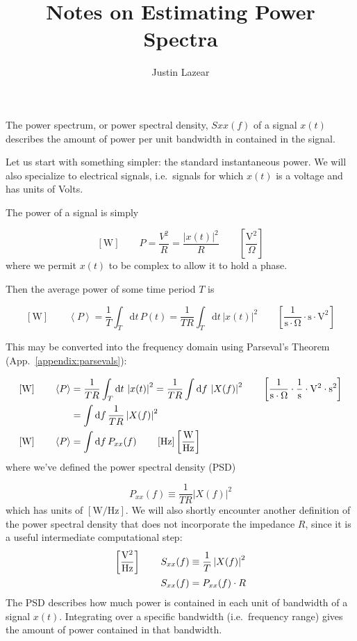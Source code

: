 \documentclass{article}
\title{Notes on Estimating Power Spectra}
\author{Justin Lazear}
\newcommand{\dd}[1]{\mathrm{d}#1\,}
\newcommand{\Avg}[1]{\left< #1 \right>}
\begin{document}
\maketitle

The power spectrum, or power spectral density, \(Sxx(f)\) of a signal \(x(t)\) 
describes the amount of power per unit bandwidth in contained in the signal. 

Let us start with something simpler: the standard instantaneous power. We will
also specialize to electrical signals, i.e.~signals for which \(x(t)\) is a 
voltage and has units of Volts. 

The power of a signal is simply

\[\left[\mathrm{W}\right] \qquad P = \frac{V^2}{R} = \frac{\left|x(t)\right|^2}{R} \qquad \left[\frac{\mathrm{V}^2}{\Omega}\right]\]
%
where we permit \(x(t)\) to be complex to allow it to hold a phase. 

Then the average power of some time period \(T\) is

\begin{equation}
    \left[\mathrm{W}\right] \qquad \Avg{P} = \frac{1}{T} \int_T \dd{t} P(t) = \frac{1}{TR} \int_T \dd{t} \left|x(t)\right|^2 \qquad \left[\mathrm{\frac{1}{s\cdot \Omega} \cdot s \cdot V^2}\right] \label{eq:power}
\end{equation}

This may be converted into the frequency domain using Parseval's Theorem
(App.~\ref{appendix:parsevals}):

\begin{align}
    \left[\mathrm{W}\right] \qquad \Avg{P} & = \frac{1}{TR} \int_T \dd{t} \left|x(t)\right|^2 = \frac{1}{TR} \int \dd{f} \left|X(f)\right|^2 \qquad \left[\mathrm{\frac{1}{s\cdot \Omega} \cdot \frac{1}{s} \cdot V^2\cdot s^2}\right] \notag \\
    & = \int \dd{f} \frac{1}{TR} \left|X(f)\right|^2 \notag \\
    \left[\mathrm{W}\right] \qquad \Avg{P} & = \int \dd{f} P_{xx}(f) \qquad \left[\mathrm{Hz}\right] \left[\mathrm{\frac{W}{Hz}}\right]\label{eq:Pxx}
\end{align}
%
where we've defined the power spectral density (PSD)

\begin{equation}
    P_{xx}(f) \equiv \frac{1}{TR}\left|X(f)\right|^2 \label{eq:Pxxdef}
\end{equation}
%
which has units of \(\left[\mathrm{W/Hz}\right]\). We will also shortly encounter another
definition of the power spectral density that does not incorporate the impedance \(R\),
since it is a useful intermediate computational step:
\begin{align}
    \left[\mathrm{\frac{V^2}{Hz}}\right] \qquad S_{xx}(f) & \equiv \frac{1}{T}\left|X(f)\right|^2 \label{eq:Sxxdef} \\
    S_{xx}(f) & = P_{xx}(f) \cdot R \notag
\end{align}
%
The PSD describes how much power is contained in each unit of bandwidth of a signal
\(x(t)\). Integrating over a specific bandwidth (i.e.~frequency range) gives the
amount of power contained in that bandwidth. 
\end{document}
